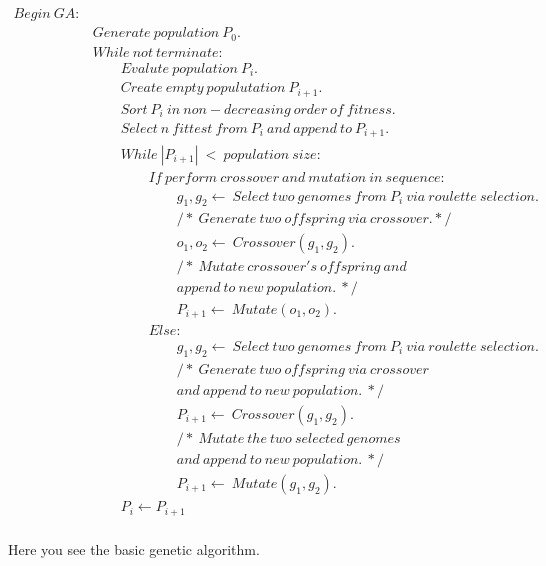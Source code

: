 \documentclass[a4paper,10pt]{article}
\begin{document}
\begin{figure}[H]
\begin{equation*}
\boxed{
\begin{aligned}
Begin \ GA: & \\
&Generate \ population \ P_0. \\
& While \ not \ terminate: \\
& \quad\quad Evalute \ population \ P_i. \\
& \quad\quad Create \ empty \ populutation \ P_{i+1}. \\
& \quad\quad Sort \ P_i \ in \ non\!-\!decreasing \ order \ of \ fitness. \\
& \quad\quad Select \ n \ fittest \ from \ P_i \ and \ append \ to \ P_{i+1}. \\
& \quad\quad While \ |P_{i+1}| \ < \  population \ size: \\
& \quad\quad\quad\quad If \ perform \ crossover \ and \ mutation \ in \ sequence: \\
& \quad\quad\quad\quad\quad\quad g_1,g_2 \longleftarrow \ Select \ two \ genomes \ from \ P_i \ via \ roulette \ selection. \\
& \quad\quad\quad\quad\quad\quad /\!* \ Generate \ two \ of\! fspring \ via \ crossover. *\!/ \\
& \quad\quad\quad\quad\quad\quad o_1,o_2 \longleftarrow \ Crossover( g_1, g_2 ). \\
& \quad\quad\quad\quad\quad\quad /\!* \ Mutate \ crossover's \ of\!fspring \ and \\
& \quad\quad\quad\quad\quad\quad append \ to \ new \ population. \ *\!/ \\
& \quad\quad\quad\quad\quad\quad P_{i+1} \longleftarrow \ Mutate( o_1, o_2 ). \\
& \quad\quad\quad\quad Else: \\
& \quad\quad\quad\quad\quad\quad g_1,g_2 \longleftarrow \ Select \ two \ genomes \ from \ P_i \ via \ roulette \ selection. \\
& \quad\quad\quad\quad\quad\quad /\!* \ Generate \ two \ of\!fspring \ via \ crossover \\
& \quad\quad\quad\quad\quad\quad and \ append \ to \ new \ population. \ *\!/  \\
& \quad\quad\quad\quad\quad\quad P_{i+1} \longleftarrow \ Crossover( g_1, g_2 ). \\
& \quad\quad\quad\quad\quad\quad /\!* \ Mutate \ the \ two \ selected \ genomes \\
& \quad\quad\quad\quad\quad\quad and \ append \ to \ new \ population. \ *\!/  \\
& \quad\quad\quad\quad\quad\quad P_{i+1} \longleftarrow \ Mutate( g_1, g_2 ). \\
& \quad\quad P_{i} \longleftarrow P_{i+1}\\
\end{aligned}
}
\end{equation*}
\caption{Here you see the basic genetic algorithm.}
\label{fig:ga}
\end{figure}
\end{document}
